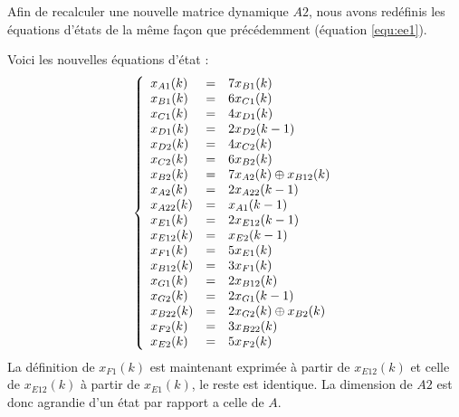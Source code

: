 Afin de recalculer une nouvelle matrice dynamique $A2$, nous avons redéfinis les équations d'états de la même façon que précédemment (équation \ref{equ:ee1}). 

Voici les nouvelles équations d'état :
\begin{equation}
\label{equ:ee4}
\left\lbrace
\begin{array}{l c l}
x_{A1}(k) &=&	7x_{B1}(k)\\ 
x_{B1}(k) &=&	6x_{C1}(k)\\
x_{C1}(k) &=& 	4x_{D1}(k)\\
x_{D1}(k) &=&	2x_{D2}(k-1)\\
x_{D2}(k) &=&	4x_{C2}(k)\\
x_{C2}(k) &=&	6x_{B2}(k)\\
x_{B2}(k) &=&	7x_{A2}(k) \oplus x_{B12}(k)\\
x_{A2}(k) &=&	2x_{A22}(k-1)\\
x_{A22}(k) &=&	x_{A1}(k-1)\\
%
x_{E1}(k) &=&	2x_{E12}(k-1)\\
x_{E12}(k) &=&	x_{E2}(k-1)\\
x_{F1}(k) &=&	5x_{E1}(k)\\
x_{B12}(k) &=&	3x_{F1}(k)\\
x_{G1}(k) &=&	2x_{B12}(k)\\
x_{G2}(k) &=&	2x_{G1}(k-1)\\
x_{B22}(k) &=&	2x_{G2}(k) \oplus x_{B2}(k)\\
x_{F2}(k) &=&	3x_{B22}(k)\\
x_{E2}(k) &=&	5x_{F2}(k)   \\  
\end{array}
\right. 
\end{equation}
La définition de $x_{F1}(k)$ est maintenant exprimée à partir de $x_{E12}(k)$ et celle de $x_{E12}(k)$ à partir de $x_{E1}(k)$, le reste est identique.
La dimension de $A2$ est donc agrandie d'un état par rapport a celle de $A$.

